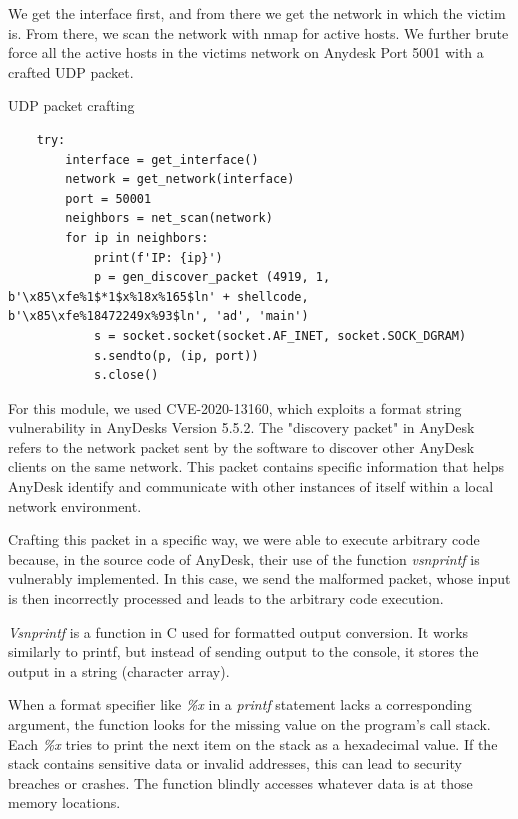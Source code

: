 We get the interface first, and from there we get the network in which the victim is. From there, we scan the network with nmap for active hosts. We further brute force all the active hosts in the victims network on Anydesk Port 5001 with a crafted UDP packet.

\begin{codesnippet}[H]
    \caption{UDP packet crafting}
    \label{code:packet_crafting}
\end{codesnippet}
\vspace{-0.75cm}
\begin{lstlisting}
    try:
        interface = get_interface()
        network = get_network(interface)
        port = 50001
        neighbors = net_scan(network)
        for ip in neighbors:
            print(f'IP: {ip}')
            p = gen_discover_packet (4919, 1, b'\x85\xfe%1$*1$x%18x%165$ln' + shellcode, b'\x85\xfe%18472249x%93$ln', 'ad', 'main')
            s = socket.socket(socket.AF_INET, socket.SOCK_DGRAM)
            s.sendto(p, (ip, port))
            s.close()
\end{lstlisting}

For this module, we used CVE-2020-13160, which exploits a format string vulnerability in AnyDesks Version 5.5.2. The "discovery packet" in AnyDesk refers to the network packet sent by the software to discover other AnyDesk clients on the same network. This packet contains specific information that helps AnyDesk identify and communicate with other instances of itself within a local network environment.

Crafting this packet in a specific way, we were able to execute arbitrary code because, in the source code of AnyDesk, their use of the function \textit{vsnprintf} is vulnerably implemented. In this case, we send the malformed packet, whose input is then incorrectly processed and leads to the arbitrary code execution.

\textit{Vsnprintf} is a function in C used for formatted output conversion. It works similarly to printf, but instead of sending output to the console, it stores the output in a string (character array).

When a format specifier like \textit{\%x} in a \textit{printf} statement lacks a corresponding argument, the function looks for the missing value on the program's call stack. Each \textit{\%x} tries to print the next item on the stack as a hexadecimal value. If the stack contains sensitive data or invalid addresses, this can lead to security breaches or crashes. The function blindly accesses whatever data is at those memory locations.

